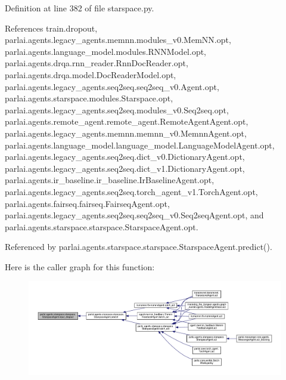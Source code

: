 Definition at line 382 of file starspace.\+py.



References train.\+dropout, parlai.\+agents.\+legacy\+\_\+agents.\+memnn.\+modules\+\_\+v0.\+Mem\+N\+N.\+opt, parlai.\+agents.\+language\+\_\+model.\+modules.\+R\+N\+N\+Model.\+opt, parlai.\+agents.\+drqa.\+rnn\+\_\+reader.\+Rnn\+Doc\+Reader.\+opt, parlai.\+agents.\+drqa.\+model.\+Doc\+Reader\+Model.\+opt, parlai.\+agents.\+legacy\+\_\+agents.\+seq2seq.\+seq2seq\+\_\+v0.\+Agent.\+opt, parlai.\+agents.\+starspace.\+modules.\+Starspace.\+opt, parlai.\+agents.\+legacy\+\_\+agents.\+seq2seq.\+modules\+\_\+v0.\+Seq2seq.\+opt, parlai.\+agents.\+remote\+\_\+agent.\+remote\+\_\+agent.\+Remote\+Agent\+Agent.\+opt, parlai.\+agents.\+legacy\+\_\+agents.\+memnn.\+memnn\+\_\+v0.\+Memnn\+Agent.\+opt, parlai.\+agents.\+language\+\_\+model.\+language\+\_\+model.\+Language\+Model\+Agent.\+opt, parlai.\+agents.\+legacy\+\_\+agents.\+seq2seq.\+dict\+\_\+v0.\+Dictionary\+Agent.\+opt, parlai.\+agents.\+legacy\+\_\+agents.\+seq2seq.\+dict\+\_\+v1.\+Dictionary\+Agent.\+opt, parlai.\+agents.\+ir\+\_\+baseline.\+ir\+\_\+baseline.\+Ir\+Baseline\+Agent.\+opt, parlai.\+agents.\+legacy\+\_\+agents.\+seq2seq.\+torch\+\_\+agent\+\_\+v1.\+Torch\+Agent.\+opt, parlai.\+agents.\+fairseq.\+fairseq.\+Fairseq\+Agent.\+opt, parlai.\+agents.\+legacy\+\_\+agents.\+seq2seq.\+seq2seq\+\_\+v0.\+Seq2seq\+Agent.\+opt, and parlai.\+agents.\+starspace.\+starspace.\+Starspace\+Agent.\+opt.



Referenced by parlai.\+agents.\+starspace.\+starspace.\+Starspace\+Agent.\+predict().

Here is the caller graph for this function\+:
\nopagebreak
\begin{figure}[H]
\begin{center}
\leavevmode
\includegraphics[width=350pt]{classparlai_1_1agents_1_1starspace_1_1starspace_1_1StarspaceAgent_a6511fc8a4d2687cd99a981b4e3b6a589_icgraph}
\end{center}
\end{figure}
\mbox{\label{classparlai_1_1agents_1_1starspace_1_1starspace_1_1StarspaceAgent_a57f2fcd5e04246f3d8edf57ccdb99eab}} 
